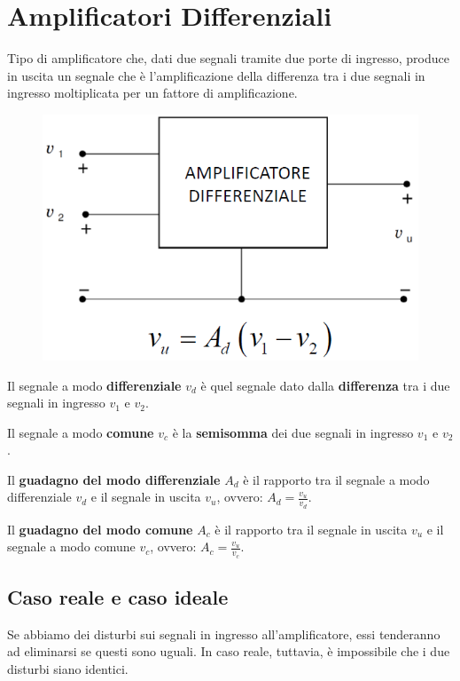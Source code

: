 \documentclass[11pt,a4paper,]{article}
\begin{document}
\section{Amplificatori Differenziali}
\begin{definizione}
    Tipo di amplificatore che, dati due segnali tramite due porte di ingresso, produce in uscita un segnale che è l'amplificazione della differenza tra i due segnali in ingresso moltiplicata per un fattore di amplificazione.
    \begin{figure}[H]
        \centering
        \includegraphics[width=0.25\linewidth]{img/ampl diff.png}
    \end{figure}
\end{definizione}
\begin{definizione}
    Il segnale a modo \textbf{differenziale} $v_d$ è quel segnale dato dalla \textbf{differenza} tra i due segnali in ingresso $v_1$ e $v_2$.
\end{definizione}
\begin{definizione}
    Il segnale a modo \textbf{comune} $v_c$ è la \textbf{semisomma} dei due segnali in ingresso $v_1$ e $v_2$.
\end{definizione}
\begin{definizione}
    Il \textbf{guadagno del modo differenziale} $A_d$ è il rapporto tra il segnale a modo differenziale $v_d$ e il segnale in uscita $v_u$, ovvero: $A_d = \frac{v_u}{v_d}$.    
\end{definizione}
\begin{definizione}
    Il \textbf{guadagno del modo comune} $A_c$ è il rapporto tra il segnale in uscita $v_u$ e il segnale a modo comune $v_c$, ovvero: $A_c = \frac{v_u}{v_c}$.    
\end{definizione}

\subsection{Caso reale e caso ideale}
Se abbiamo dei disturbi sui segnali in ingresso all'amplificatore, essi tenderanno ad eliminarsi se questi sono uguali. In caso reale, tuttavia, è impossibile che i due disturbi siano identici.
\end{document}
